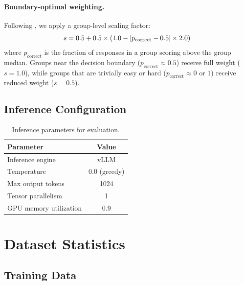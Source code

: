 \documentclass[11pt]{article}
\begin{document}
\paragraph{Boundary-optimal weighting.}
Following \citet{chen2025drzero}, we apply a group-level scaling factor:
\begin{equation}
\small
s = 0.5 + 0.5 \times (1.0 - |p_{\text{correct}} - 0.5| \times 2.0)
\end{equation}
where $p_{\text{correct}}$ is the fraction of responses in a group scoring above the group median.
Groups near the decision boundary ($p_{\text{correct}} \approx 0.5$) receive full weight ($s{=}1.0$), while groups that are trivially easy or hard ($p_{\text{correct}} \approx 0$ or $1$) receive reduced weight ($s{=}0.5$).


\subsection{Inference Configuration}

\begin{table}[h]
\centering
\small
\caption{Inference parameters for evaluation.}
\label{tab:inference}
\begin{tabular}{lc}
\toprule
\textbf{Parameter} & \textbf{Value} \\
\midrule
Inference engine & vLLM \\
Temperature & 0.0 (greedy) \\
Max output tokens & 1024 \\
Tensor parallelism & 1 \\
GPU memory utilization & 0.9 \\
\bottomrule
\end{tabular}
\end{table}


\section{Dataset Statistics}
\label{app:data}

\subsection{Training Data}
\end{document}
